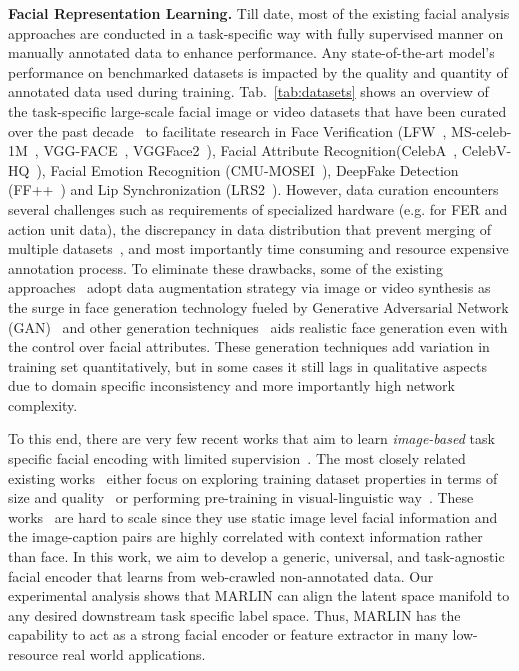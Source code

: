 \documentclass[10pt,twocolumn,letterpaper]{article}
\begin{document}
\noindent \textbf{Facial Representation Learning.} 
Till date, most of the existing facial analysis approaches are conducted in a task-specific way with fully supervised manner \cite{schroffFaceNet2015,parkhiDeep2015,korshunovDeepFakes2018} on manually annotated data to enhance performance. Any state-of-the-art model's performance on benchmarked datasets is impacted by the quality and quantity of annotated data used during training.  Tab.~\ref{tab:datasets} shows an overview of the task-specific large-scale facial image or video datasets that have been curated over the past decade~\cite{adjabiPresent2020} to facilitate research in Face Verification (LFW~\cite{huangLabeled2008}, MS-celeb-1M~\cite{guoMSCeleb1M2016}, VGG-FACE~\cite{parkhiDeep2015}, VGGFace2~\cite{caoVGGFace22018}), Facial Attribute Recognition(CelebA~\cite{liuDeep2015}, CelebV-HQ~\cite{zhuCelebVHQ2022}), Facial Emotion Recognition (CMU-MOSEI~\cite{zadehMultiattention2018a}), DeepFake Detection (FF++~\cite{rosslerFaceForensics2019}) and Lip Synchronization (LRS2~\cite{chungLip2017}). However, data curation encounters several challenges such as requirements of specialized hardware (e.g. for FER and action unit data), the discrepancy in data distribution that prevent merging of multiple datasets~\cite{bulatPretraining2022}, and most importantly time consuming and resource expensive annotation process. To eliminate these drawbacks, some of the existing approaches~\cite{choiStarGAN2020,yanVideoGPT2021,yuGenerating2022} adopt data augmentation strategy via image or video synthesis as the surge in face generation technology fueled by Generative Adversarial Network (GAN)~\cite{choiStarGAN2020,yanVideoGPT2021,yuGenerating2022,skorokhodovStyleGANV2022} and other generation techniques~\cite{haoGANcraft2021,chanPiGAN2021} aids realistic face generation even with the control over facial attributes. These generation techniques add variation in training set quantitatively, but in some cases it still lags in qualitative aspects due to domain specific inconsistency and more importantly high network complexity.     


To this end, there are very few recent works that aim to learn \textit{image-based} task specific facial encoding with limited supervision~\cite{zhengGeneral2022,bulatPretraining2022,anejaGeneralized2020,zhuangFewShot2021,browatzki3FabRec2020,shuLearning2021,zhuangFewShot2021,zhengGeneral2022}. The most closely related existing works~\cite{bulatPretraining2022,zhengGeneral2022} either focus on exploring training dataset properties in terms of size and quality~\cite{bulatPretraining2022} or performing pre-training in visual-linguistic way~\cite{zhengGeneral2022}. These works~\cite{bulatPretraining2022,zhengGeneral2022} are hard to scale since they use static image level facial information and the image-caption pairs are highly correlated with context information rather than face. In this work, we aim to develop a generic, universal, and task-agnostic facial encoder that learns from web-crawled non-annotated data. Our experimental analysis shows that MARLIN can align the latent space manifold to any desired downstream task specific label space. Thus, MARLIN has the capability to act as a strong facial encoder or feature extractor in many low-resource real world applications. 
\end{document}
